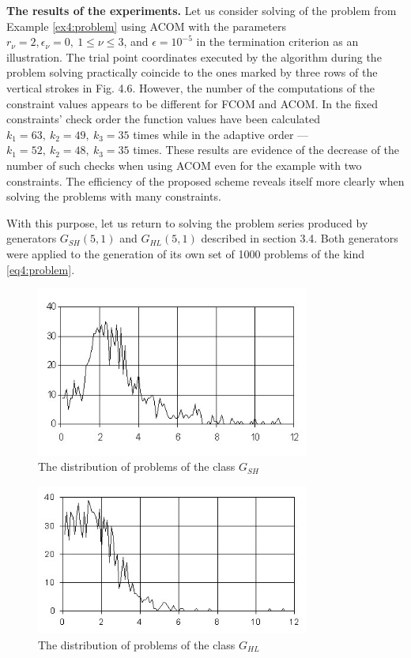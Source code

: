 \textbf{The results of the experiments.} Let us consider solving of the problem from Example \ref{ex4:problem} using ACOM with the parameters $r_\nu=2, \epsilon_\nu=0,\: 1\le \nu\le 3$, and $\epsilon=10^{-5}$ in the termination criterion as an illustration. The trial point coordinates executed by the algorithm during the
problem solving practically coincide to the ones marked by three rows of the vertical strokes in Fig. 4.6. However, the number of the computations of the constraint values appears to be different for FCOM and ACOM. In the fixed constraints’ check order the function values have been calculated $k_1 =63,\: k_2 =49,\: k_3 =35$ times while in the adaptive order --- $k_1 =52,\: k_2 =48,\:
k_3 =35$ times. These results are evidence of the decrease of the number of such checks when using ACOM even for the example with two constraints. The efficiency of the proposed scheme reveals itself more clearly when solving the problems with many constraints.

With this purpose, let us return to solving the problem series produced by generators $G_{SH}(5,1)$ and $G_{HL} (5,1)$ described in section 3.4. Both generators were applied to the generation of
its own set of 1000 problems of the kind \eqref{eq4:problem}.

\begin{figure}[ht]
  \centering
  \includegraphics[width=0.8\textwidth]{figures/4_11.jpg}
  \caption{The distribution of problems of the class $G_{SH}$}
  \label{fig:4_11}
\end{figure}

\begin{figure}[ht]
  \centering
  \includegraphics[width=0.8\textwidth]{figures/4_12.jpg}
  \caption{The distribution of problems of the class $G_{HL}$}
  \label{fig:4_12}
\end{figure}

